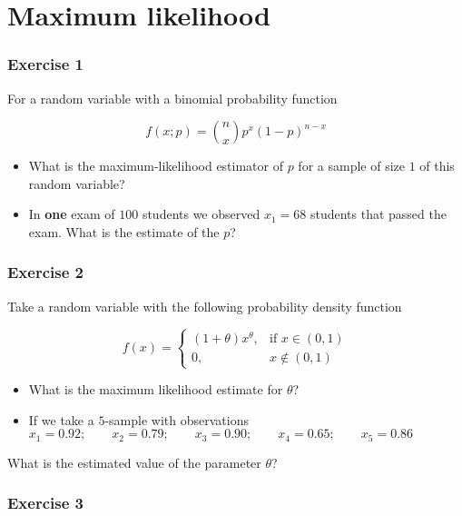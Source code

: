 \documentclass[
]{book}
\begin{document}
\hypertarget{maximum-likelihood}{%
\section{Maximum likelihood}\label{maximum-likelihood}}

\hypertarget{exercise-1-7}{%
\subsubsection{Exercise 1}\label{exercise-1-7}}

For a random variable with a binomial probability function

\[f(x; p)=\binom n x p^x(1-p)^{n-x}\]

\begin{itemize}
\item
  What is the maximum-likelihood estimator of \(p\) for a sample of size \(1\) of this random variable?
\item
  In \textbf{one} exam of \(100\) students we observed \(x_1=68\) students that passed the exam. What is the estimate of the \(p\)?
\end{itemize}

\hypertarget{exercise-2-7}{%
\subsubsection{Exercise 2}\label{exercise-2-7}}

Take a random variable with the following probability density function

\[
f(x)=
\begin{cases}
    (1+\theta)x^\theta,& \text{if } x\in (0,1)\\
    0,&  x\notin (0,1)
\end{cases}
\]

\begin{itemize}
\item
  What is the maximum likelihood estimate for \(\theta\)?
\item
  If we take a \(5\)-sample with observations
  \(x_1 = 0.92; \qquad x_2 = 0.79; \qquad x_3 = 0.90; \qquad x_4 = 0.65; \qquad x_5 = 0.86\)
\end{itemize}

What is the estimated value of the parameter \(\theta\)?

\hypertarget{exercise-3-4}{%
\subsubsection{Exercise 3}\label{exercise-3-4}}
\end{document}
